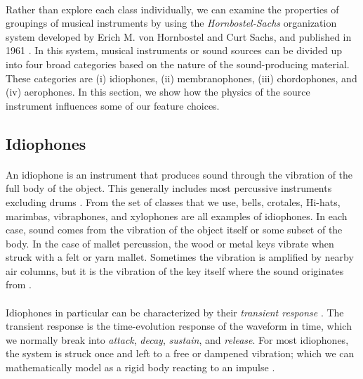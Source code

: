 \documentclass[12pt,letterpaper]{article}
\begin{document}
\paragraph*{}Rather than explore each class individually, we can examine the properties of groupings of musical instruments by using the \textit{Hornbostel-Sachs} organization system developed by  Erich M. von Hornbostel and Curt Sachs, and published in 1961 \cite{Hornbostel}. In this system, musical instruments or sound sources can be divided up into four broad categories based on the nature of the sound-producing material. These categories are (i) idiophones, (ii) membranophones, (iii) chordophones, and (iv) aerophones. In this section, we show how the physics of the source instrument influences some of our feature choices.


\subsection{Idiophones}
\label{subsec-Idiophone}

\paragraph*{}An idiophone is an instrument that produces sound through the vibration of the full body of the object. This generally includes most percussive instruments excluding drums \cite{Hornbostel}. From the set of classes that we use, bells, crotales, Hi-hats, marimbas, vibraphones, and xylophones are all examples of idiophones. In each case, sound comes from the vibration of the object itself or some subset of the body. In the case of mallet percussion, the wood or metal keys vibrate when struck with a felt or yarn mallet. Sometimes the vibration is amplified by nearby air columns, but it is the vibration of the key itself where the sound originates from \cite{Olson}.

\paragraph*{}Idiophones in particular can be characterized by their \textit{transient response} \cite{White}. The transient response is the time-evolution response of the waveform in time, which we normally break into \textit{attack}, \textit{decay}, \textit{sustain}, and \textit{release}. For most idiophones, the system is struck once and left to a free or dampened vibration; which we can mathematically model as a rigid body reacting to an impulse \cite{Hunter,Olson}.
\end{document}
